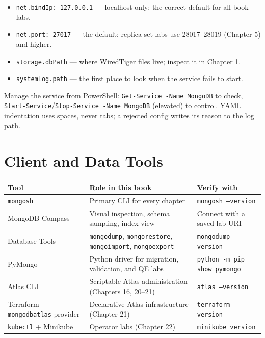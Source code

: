 \begin{itemize}
    \item \texttt{net.bindIp: 127.0.0.1} --- localhost only; the correct default for all book labs.
    \item \texttt{net.port: 27017} --- the default; replica-set labs use 28017--28019 (Chapter 5) and higher.
    \item \texttt{storage.dbPath} --- where WiredTiger files live; inspect it in Chapter 1.
    \item \texttt{systemLog.path} --- the first place to look when the service fails to start.
\end{itemize}

\noindent Manage the service from PowerShell: \texttt{Get-Service -Name MongoDB} to check,
\texttt{Start-Service}/\texttt{Stop-Service -Name MongoDB} (elevated) to control. YAML indentation
uses spaces, never tabs; a rejected config writes its reason to the log path.

\section{Client and Data Tools}
%
\begin{center}
\footnotesize
\begin{tabular}{@{}p{3.2cm}p{4.6cm}p{4.8cm}@{}}
\toprule
\textbf{Tool} & \textbf{Role in this book} & \textbf{Verify with} \\
\midrule
\texttt{mongosh} & Primary CLI for every chapter & \texttt{mongosh --version} \\
MongoDB Compass & Visual inspection, schema sampling, index view & Connect with a saved lab URI \\
Database Tools & \texttt{mongodump}, \texttt{mongorestore}, \texttt{mongoimport}, \texttt{mongoexport} & \texttt{mongodump --version} \\
PyMongo & Python driver for migration, validation, and QE labs & \texttt{python -m pip show pymongo} \\
Atlas CLI & Scriptable Atlas administration (Chapters 16, 20--21) & \texttt{atlas --version} \\
Terraform + \texttt{mongodbatlas} provider & Declarative Atlas infrastructure (Chapter 21) & \texttt{terraform version} \\
\texttt{kubectl} + Minikube & Operator labs (Chapter 22) & \texttt{minikube version} \\
\bottomrule
\end{tabular}
\end{center}

